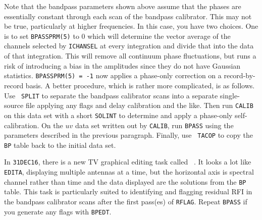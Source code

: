 Note that the bandpass parameters shown above assume that the phases
are essentially constant through each scan of the bandpass calibrator.
This may not be true, particularly at higher frequencies.  In this
case, you have two choices.  One is to set {\tt BPASSPRM(5)} to 0
which will determine the vector average of the channels selected by
{\tt ICHANSEL} at every integration and divide that into the data of
that integration.  This will remove all continuum phase fluctuations,
but runs a risk of introducing a bias in the amplitudes since they do
not have Gaussian statistics.  {\tt BPASSPRM(5) = -1} now applies a
phase-only correction on a record-by-record basis.  A better
procedure, which is rather more complicated, is as follows.  Use {\tt
SPLIT} to separate the bandpass calibrator scans into a separate
single-source file applying any flags and delay calibration and the
like.  Then run {\tt CALIB} on this data set with a short {\tt SOLINT}
to determine and apply a phase-only self-calibration.  On the $uv$
data set written out by {\tt CALIB}, run {\tt BPASS} using the
parameters described in the previous paragraph.  Finally, use {\tt
TACOP} to copy the {\tt BP} table back to the initial data set.

In {\tt 31DEC16}, there is a new TV graphical editing task called {\tt
{}}\@.  It looks a lot like {\tt EDITA}, displaying multiple
antennas at a time, but the horizontal axis is spectral channel rather
than time and the data displayed are the solutions from the {\tt BP}
table.  This task is particularly suited to identifying and flagging
residual RFI in the bandpass calibrator scans after the first pass(es)
of {\tt RFLAG}.  Repeat {\tt BPASS} if you generate any flags with
{\tt BPEDT}\@.

